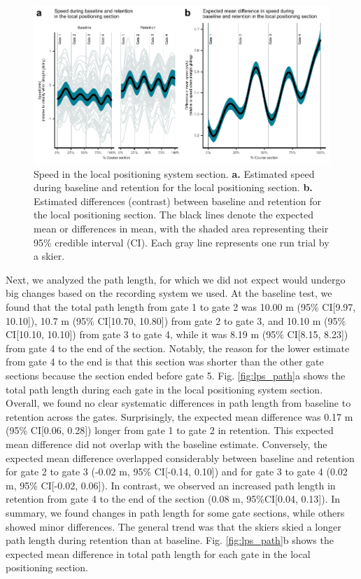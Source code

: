\begin{figure}
    \centering
    \includegraphics[width=1\linewidth]{figure/figure_speed_2.pdf}
    \caption{Speed in the local positioning system section. \textbf{a.} Estimated speed during baseline and retention for the local positioning section. \textbf{b.} Estimated differences (contrast) between baseline and retention for the local positioning section. The black lines denote the expected mean or differences in mean, with the shaded area representing their 95\% credible interval (CI). Each gray line represents one run trial by a skier.}
    \label{fig:lps_speed}
\end{figure}


Next, we analyzed the path length, for which we did not expect would undergo big changes based on the recording system we used. At the baseline test, we found that the total path length from gate 1 to gate 2 was 10.00 m (95\% CI[9.97, 10.10]), 10.7 m (95\% CI[10.70, 10.80]) from gate 2 to gate 3, and 10.10 m (95\% CI[10.10, 10.10]) from gate 3 to gate 4, while it was 8.19 m (95\% CI[8.15, 8.23]) from gate 4 to the end of the section. Notably, the reason for the lower estimate from gate 4 to the end is that this section was shorter than the other gate sections because the section ended before gate 5. Fig. \ref{fig:lps_path}a shows the total path length during each gate in the local positioning system section. Overall, we found no clear systematic differences in path length from baseline to retention across the gates. Surprisingly, the expected mean difference was 0.17 m (95\% CI[0.06, 0.28]) longer from gate 1 to gate 2 in retention. This expected mean difference did not overlap with the baseline estimate. Conversely, the expected mean difference overlapped considerably between baseline and retention for gate 2 to gate 3 (-0.02 m, 95\% CI[-0.14, 0.10]) and for gate 3 to gate 4 (0.02 m, 95\% CI[-0.02, 0.06]). In contrast, we observed an increased path length in retention from gate 4 to the end of the section (0.08 m, 95\%CI[0.04, 0.13]). In summary, we found changes in path length for some gate sections, while others showed minor differences. The general trend was that the skiers skied a longer path length during retention than at baseline. Fig. \ref{fig:lps_path}b shows the expected mean difference in total path length for each gate in the local positioning section. 

